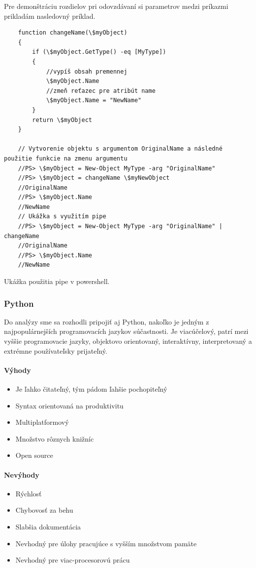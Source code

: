 Pre demonštráciu rozdielov pri odovzdávaní si parametrov medzi príkazmi prikladám nasledovný príklad.

\begin{algorithm}
	\begin{verbatim}
	function changeName(\$myObject)
	{
		if (\$myObject.GetType() -eq [MyType])
		{
			//vypíš obsah premennej
			\$myObject.Name
			//zmeň reťazec pre atribút name
			\$myObject.Name = "NewName"
		}
		return \$myObject
	}
	
	// Vytvorenie objektu s argumentom OriginalName a následné použitie funkcie na zmenu argumentu
	//PS> \$myObject = New-Object MyType -arg "OriginalName"
	//PS> \$myObject = changeName \$myNewObject
	//OriginalName
	//PS> \$myObject.Name
	//NewName
	// Ukážka s využitím pipe
	//PS> \$myObject = New-Object MyType -arg "OriginalName" | changeName
	//OriginalName
	//PS> \$myObject.Name
	//NewName
	\end{verbatim}
	\caption{Ukážka použitia pipe v powershell. \cite{netalg}}
	\label{alg:gen}
\end{algorithm}

\subsubsection{Python}
Do analýzy sme sa rozhodli pripojiť aj Python, nakoľko je jedným z najpopulárnejších programovacích jazykov súčastnosti. Je viacúčelový, patrí mezi vyššie programovacie jazyky, objektovo orientovaný, interaktívny, interpretovaný a extrémne používateľsky prijateľný.
\paragraph{Výhody}
\begin{itemize}
	\item Je ľahko čitateľný, tým pádom ľahšie pochopiteľný
	\item Syntax orientovaná na produktivitu
	\item Multiplatformový
	\item Množstvo rôznych knižníc
	\item Open source
	\newline
\end{itemize}
\paragraph{Nevýhody}
\begin{itemize}
	\item Rýchlosť
	\item Chybovosť za behu
	\item Slabšia dokumentácia
	\item Nevhodný pre úlohy pracujúce s vyšším množstvom pamäte
	\item Nevhodný pre viac-procesorovú prácu
	\newline
\end{itemize}

